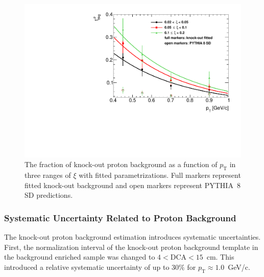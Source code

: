  \begin{figure}[h!]%
 	\centering
 	\includegraphics[width=0.8\linewidth, page=1]{chapters/chrgSTAR/img/DCAproton/bkg_p.pdf}
 	\caption{The fraction of knock-out proton background  as a function of $p_\textrm{T}$ in three ranges of $\xi$  with  fitted parametrizations. Full markers represent fitted knock-out background and open markers represent PYTHIA~8 SD predictions.}
 	\label{fig:bkg_proton_fit}
 \end{figure}

 
 \subsubsection{Systematic Uncertainty Related to Proton Background} 
The knock-out proton background estimation  introduces  systematic uncertainties. %
First, the normalization interval of the  knock-out   proton  background template in the background enriched sample was changed to $4<\textrm{DCA}<15$~cm. This introduced a relative systematic uncertainty of up to $30\%$ for $p_\textrm{T}\approx 1.0$~GeV/c. 

